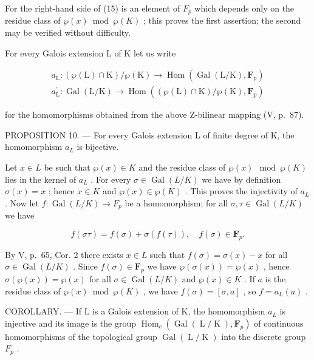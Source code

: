For the right-hand side of (15) is an element of \(F_{p}\) which depends only on the residue class of \(\wp(x)\bmod\wp(K)\) ; this proves the first assertion; the second may be verified without difficulty.

For every Galois extension L of K let us write

\[
\begin{array}{l} a _ {\mathrm{L}} \colon (\wp (\mathrm{L}) \cap \mathrm{K}) / \wp (\mathrm{K}) \to \operatorname{Hom} \left(\operatorname{Gal} (\mathrm{L} / \mathrm{K}), \mathbf {F} _ {p}\right) \\ a _ {\mathrm{L}} ^ {\prime} \colon \operatorname{Gal} (\mathrm{L} / \mathrm{K}) \to \operatorname{Hom} \left((\wp (\mathrm{L}) \cap \mathrm{K}) / \wp (\mathrm{K}), \mathbf {F} _ {p}\right) \end{array}
\]

for the homomorphisms obtained from the above Z-bilinear mapping (V, p.~87).

PROPOSITION 10. --- For every Galois extension L of finite degree of K, the homomorphism \(a_{L}\) is bijective.

Let \(x \in L\) be such that \(\wp(x) \in K\) and the residue class of \(\wp(x) \mod \wp(K)\) lies in the kernel of \(a_L\) . For every \(\sigma \in \operatorname{Gal}(L/K)\) we have by definition \(\sigma(x) = x\) ; hence \(x \in K\) and \(\wp(x) \in \wp(K)\) . This proves the injectivity of \(a_L\) . Now let \(f: \operatorname{Gal}(L/K) \to F_p\) be a homomorphism; for all \(\sigma, \tau \in \operatorname{Gal}(L/K)\) we have

\[
f (\sigma \tau) = f (\sigma) + \sigma (f (\tau)), \quad f (\sigma) \in \mathbf {F} _ {p}.
\]

By V, p.~65, Cor. 2 there exists \(x \in L\) such that \(f(\sigma) = \sigma(x) - x\) for all \(\sigma \in \operatorname{Gal}(L/K)\) . Since \(f(\sigma) \in \mathbf{F}_p\) we have \(\wp(\sigma(x)) = \wp(x)\) , hence \(\sigma(\wp(x)) = \wp(x)\) for all \(\sigma \in \operatorname{Gal}(L/K)\) and \(\wp(x) \in K\) . If \(a\) is the residue class of \(\wp(x) \bmod \wp(K)\) , we have \(f(\sigma) = [\sigma, a]\) , so \(f = a_L(a)\) .

COROLLARY. --- If L is a Galois extension of K, the homomorphism \(a_{L}\) is injective and its image is the group \(\operatorname{Hom}_{c}(\operatorname{Gal}(\operatorname{L}/\operatorname{K}), \mathbf{F}_{p})\) of continuous homomorphisms of the topological group \(\operatorname{Gal}(\operatorname{L}/\operatorname{K})\) into the discrete group \(F_{p}\) .

